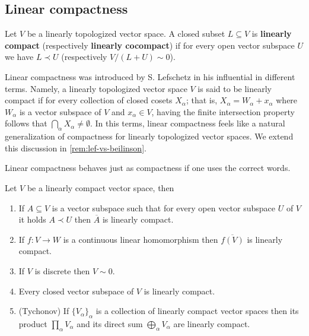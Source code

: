 \subsection*{Linear compactness}
\begin{definition}\label{def:linear_compactness}
	Let $V$ be a linearly topologized vector space. A closed subset $L \subseteq V$ is \textbf{linearly compact} (respectively \textbf{linearly cocompact}) if for every open vector subspace $U$ we have $L \prec U$ (respectively $V/(L+U) \sim 0$). 
\end{definition}
\begin{remark}\label{rem:lefschetz-linear-compactness}
	Linear compactness was introduced by S. Lefschetz in his influential \cite{Lefschetz-Alg-Top} in different terms. Namely, a linearly topologized vector space $V$ is said to be linearly compact if for every collection of closed cosets $X_{\alpha}$; that is, $X_{\alpha} = W_{\alpha} + x_{\alpha}$ where $W_{\alpha}$ is a vector subspace of $V$ and $x_{\alpha}\in V$, having the finite intersection property follows that $\bigcap_{\alpha} X_{\alpha} \neq \emptyset$. In this terms, linear compactness feels like a natural generalization of compactness for linearly topologized vector spaces. We extend this discussion in \cref{rem:lef-vs-beilinson}.
\end{remark}
Linear compactness behaves just as compactness if one uses the correct words.
\begin{proposition}\label{prop:linear_compactness_properties}
	Let $V$ be a linearly compact vector space, then
	\begin{enumerate}[label = (\alph*)]
		\item If $A \subseteq V$ is a vector subspace such that for every open vector subspace $U$ of $V$ it holds $A \prec U$ then $\overline{A}$ is linearly compact.
		\item If $f\colon V \to W$ is a continuous linear homomorphism then $\overline{f(V)}$ is linearly compact.
		\item If $V$ is discrete then $V \sim 0$.
		\item Every closed vector subspace of $V$ is linearly compact.
		\item (Tychonov) If $\{V_{\alpha}\}_{\alpha}$ is a collection of linearly compact vector spaces then its product $\prod_{\alpha} V_{\alpha}$ and its direct sum $\bigoplus_{\alpha}V_{\alpha}$ are linearly compact.
	\end{enumerate}
\end{proposition}
